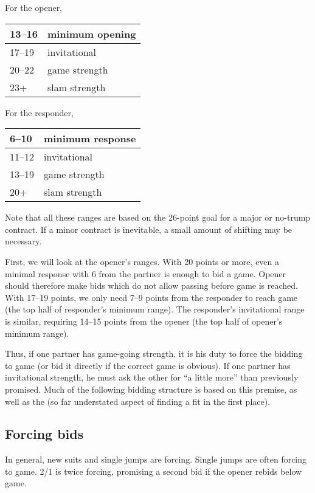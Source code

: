 \documentclass[11pt]{article}
\begin{document}
\begin{minipage}[t]{0.5\columnwidth}
For the opener,\\
\begin{tabular}{|l|l|}\hline
13--16 & minimum opening\\\hline
17--19 & invitational\\\hline
20--22 & game strength\\\hline
23+    & slam strength\\\hline
\end{tabular}
\end{minipage}
\begin{minipage}[t]{0.5\columnwidth}
For the responder,\\
\begin{tabular}{|l|l|}\hline
6--10  & minimum response\\\hline
11--12 & invitational\\\hline
13--19 & game strength \\\hline
20+    & slam strength\\\hline
\end{tabular}
\end{minipage}

Note that all these ranges are based on the 26-point goal for
a major or no-trump contract.  If a minor contract is inevitable,
a small amount of shifting may be necessary.

First, we will look at the opener's ranges.  With 20 points or more,
even a minimal response with 6 from the partner is enough to bid
a game.  Opener should therefore make bids which do not allow passing
before game is reached.  With 17--19 points, we only need 7--9 points
from the responder to reach game (the top half of responder's minimum
range).  The responder's invitational range is similar, requiring
14--15 points from the opener (the top half of opener's minimum range).

Thus, if one partner has game-going strength, it is his duty to
force the bidding to game (or bid it directly if the correct game
is obvious).  If one partner has invitational strength, he must ask
the other for ``a little more'' than previously promised.  Much of the
following bidding structure is based on this premise, as well as the
(so far understated aspect of finding a fit in the first place).

\subsection{Forcing bids}
In general, new suits and single jumps are forcing.  Single jumps are
often forcing to game.  2/1 is twice forcing, promising a second bid
if the opener rebids below game.
\end{document}
